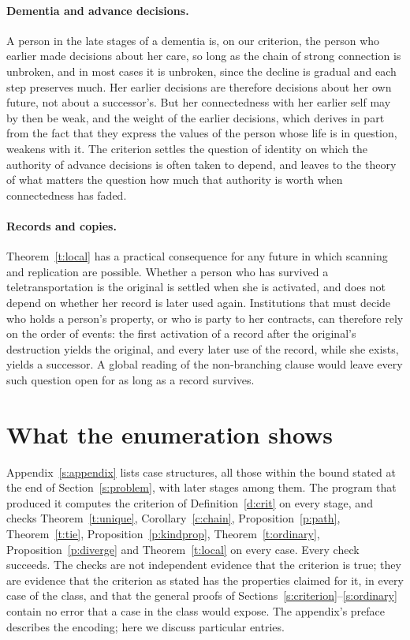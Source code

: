 \documentclass{situationist-preprint}
\begin{document}
\paragraph{Dementia and advance decisions.} A person in the late stages of a dementia is, on our criterion, the person who earlier made decisions about her care, so long as the chain of strong connection is unbroken, and in most cases it is unbroken, since the decline is gradual and each step preserves much. Her earlier decisions are therefore decisions about her own future, not about a successor's. But her connectedness with her earlier self may by then be weak, and the weight of the earlier decisions, which derives in part from the fact that they express the values of the person whose life is in question, weakens with it. The criterion settles the question of identity on which the authority of advance decisions is often taken to depend, and leaves to the theory of what matters the question how much that authority is worth when connectedness has faded.

\paragraph{Records and copies.} Theorem~\ref{t:local} has a practical consequence for any future in which scanning and replication are possible. Whether a person who has survived a teletransportation is the original is settled when she is activated, and does not depend on whether her record is later used again. Institutions that must decide who holds a person's property, or who is party to her contracts, can therefore rely on the order of events: the first activation of a record after the original's destruction yields the original, and every later use of the record, while she exists, yields a successor. A global reading of the non-branching clause would leave every such question open for as long as a record survives.

\section{What the enumeration shows}\label{s:cases}

Appendix~\ref{s:appendix} lists \stcases{} case structures, all those within the bound stated at the end of Section~\ref{s:problem}, with \ststages{} later stages among them. The program that produced it computes the criterion of Definition~\ref{d:crit} on every stage, and checks Theorem~\ref{t:unique}, Corollary~\ref{c:chain}, Proposition~\ref{p:path}, Theorem~\ref{t:tie}, Proposition~\ref{p:kindprop}, Theorem~\ref{t:ordinary}, Proposition~\ref{p:diverge} and Theorem~\ref{t:local} on every case. Every check succeeds. The checks are not independent evidence that the criterion is true; they are evidence that the criterion as stated has the properties claimed for it, in every case of the class, and that the general proofs of Sections~\ref{s:criterion}--\ref{s:ordinary} contain no error that a case in the class would expose. The appendix's preface describes the encoding; here we discuss particular entries.
\end{document}
